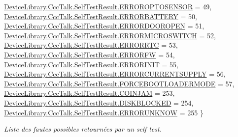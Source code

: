 \begin{DoxyCompactItemize}
\newline
\mbox{\hyperlink{group___erreur_gga179570d2d8f6f95d52ccafb98d20c790a5f416c3c0f2315e101772fb4afa19159}{Device\+Library.\+Ccc\+Talk.\+Self\+Test\+Result.\+E\+R\+R\+O\+R\+O\+P\+T\+O\+S\+E\+N\+S\+OR}} = 49, 
\mbox{\hyperlink{group___erreur_gga179570d2d8f6f95d52ccafb98d20c790abc304fceb86fed05a9c1480ae161e105}{Device\+Library.\+Ccc\+Talk.\+Self\+Test\+Result.\+E\+R\+R\+O\+R\+B\+A\+T\+T\+E\+RY}} = 50, 
\mbox{\hyperlink{group___erreur_gga179570d2d8f6f95d52ccafb98d20c790a2e7bbba7a345ba75be6d7afa5099e4b2}{Device\+Library.\+Ccc\+Talk.\+Self\+Test\+Result.\+E\+R\+R\+O\+R\+D\+O\+O\+R\+O\+P\+EN}} = 51, 
\mbox{\hyperlink{group___erreur_gga179570d2d8f6f95d52ccafb98d20c790aaccb25b7024f8a8457070b5f219cc8cb}{Device\+Library.\+Ccc\+Talk.\+Self\+Test\+Result.\+E\+R\+R\+O\+R\+M\+I\+C\+R\+O\+S\+W\+I\+T\+CH}} = 52, 
\newline
\mbox{\hyperlink{group___erreur_gga179570d2d8f6f95d52ccafb98d20c790a452e48f2270532eeb8a7d1a08b2bffa9}{Device\+Library.\+Ccc\+Talk.\+Self\+Test\+Result.\+E\+R\+R\+O\+R\+R\+TC}} = 53, 
\mbox{\hyperlink{group___erreur_gga179570d2d8f6f95d52ccafb98d20c790a17067ea1451de42b4bf3752122768b55}{Device\+Library.\+Ccc\+Talk.\+Self\+Test\+Result.\+E\+R\+R\+O\+R\+FW}} = 54, 
\mbox{\hyperlink{group___erreur_gga179570d2d8f6f95d52ccafb98d20c790a742a02b5a464f1e436fe1ce890b537a8}{Device\+Library.\+Ccc\+Talk.\+Self\+Test\+Result.\+E\+R\+R\+O\+R\+I\+N\+IT}} = 55, 
\mbox{\hyperlink{group___erreur_gga179570d2d8f6f95d52ccafb98d20c790a83c9f2a51be490451be24a146c1d808b}{Device\+Library.\+Ccc\+Talk.\+Self\+Test\+Result.\+E\+R\+R\+O\+R\+C\+U\+R\+R\+E\+N\+T\+S\+U\+P\+P\+LY}} = 56, 
\newline
\mbox{\hyperlink{group___erreur_gga179570d2d8f6f95d52ccafb98d20c790ad7e9c71913cffcaabd565eaee9cf52b8}{Device\+Library.\+Ccc\+Talk.\+Self\+Test\+Result.\+F\+O\+R\+C\+E\+B\+O\+O\+T\+L\+O\+A\+D\+E\+R\+M\+O\+DE}} = 57, 
\mbox{\hyperlink{group___erreur_gga179570d2d8f6f95d52ccafb98d20c790a5fd22f0fcfa09dee2ad29a0653ed7963}{Device\+Library.\+Ccc\+Talk.\+Self\+Test\+Result.\+C\+O\+I\+N\+J\+AM}} = 253, 
\mbox{\hyperlink{group___erreur_gga179570d2d8f6f95d52ccafb98d20c790acaf20830f50dde044b5d55b78bd4ccfe}{Device\+Library.\+Ccc\+Talk.\+Self\+Test\+Result.\+D\+I\+S\+K\+B\+L\+O\+C\+K\+ED}} = 254, 
\mbox{\hyperlink{group___erreur_gga179570d2d8f6f95d52ccafb98d20c790a17871c6d9d47f1e52c2681e98a1a9143}{Device\+Library.\+Ccc\+Talk.\+Self\+Test\+Result.\+E\+R\+R\+O\+R\+U\+N\+K\+N\+OW}} = 255
 \}
\begin{DoxyCompactList}\small\item\em Liste des fautes possibles retournées par un self test. \end{DoxyCompactList}\end{DoxyCompactItemize}


